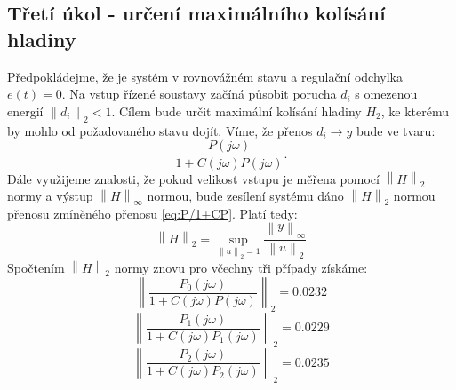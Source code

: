 \documentclass[a4paper,11pt]{article}
\begin{document}
\subsection{Třetí úkol - určení maximálního kolísání hladiny}
Předpokládejme, že je systém v rovnovážném stavu a regulační odchylka $ e\left ( t \right )=0 $. Na vstup řízené soustavy začíná působit porucha $ d_{i} $ s omezenou energií $ \left \| d_{i} \right \|_{2}<1 $. Cílem bude určit maximální kolísání hladiny $ H_{2} $, ke kterému by mohlo od požadovaného stavu dojít.
Víme, že přenos $ d_{i}\rightarrow y $ bude ve tvaru:
\begin{equation}\label{eq:P/1+CP} 
\frac{P\left (j\omega  \right )}{1+ C\left ( j\omega  \right )P\left ( j\omega  \right )}.
\end{equation}
Dále využijeme znalosti, že pokud velikost vstupu je měřena pomocí $ \left \| H \right \|_{2} $ normy a výstup $ \left \| H \right \|_{\infty }$ normou, bude zesílení systému dáno $ \left \| H \right \|_{2} $ normou přenosu zmíněného přenosu \ref{eq:P/1+CP}. Platí tedy: 
\begin{equation}
\left \| H \right \|_{2}=\sup_{\left \| u \right \|_{2}=1}\frac{\left \| y \right \|_{\infty }}{\left \| u \right \|_{2}}
\end{equation}
Spočtením $ \left \| H \right \|_{2} $ normy znovu pro včechny tři případy získáme:
$$ \left \| \frac{P_{0}\left (j\omega  \right )}{1+ C\left ( j\omega  \right )P\left ( j\omega  \right )} \right\|_{2} = 0.0232 $$
$$ \left \| \frac{P_{1}\left (j\omega  \right )}{1+ C\left ( j\omega  \right )P_{1}\left ( j\omega  \right )} \right \|_{2} = 0.0229 $$
$$ \left \| \frac{P_{2}\left (j\omega  \right )}{1+ C\left ( j\omega  \right )P_{2}\left ( j\omega  \right )} \right \|_{2} = 0.0235$$


\newpage 
\end{document}
